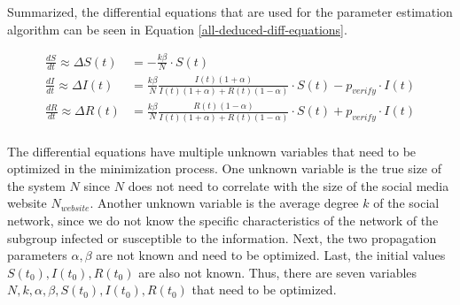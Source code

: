 Summarized, the differential equations that are used for the parameter estimation 
algorithm can be seen in Equation \ref{all-deduced-diff-equations}.

\begin{subequations}
    \begin{align}
        \frac{dS}{dt} \approx \Delta S(t) &= -\frac{k\beta}{N} \cdot S(t) \\
        \frac{dI}{dt} \approx  \Delta I(t) &=  \frac{k\beta}{N} \frac{I(t)(1+\alpha)}{I(t)(1+\alpha)+R(t)(1-\alpha)}
        \cdot S(t) - p_{verify}\cdot I(t) \\
        \frac{dR}{dt} \approx \Delta R(t) &= \frac{k\beta}{N} \frac{R(t)(1-\alpha)}{I(t)(1+\alpha)+R(t)(1-\alpha)} 
        \cdot S(t) + p_{verify}\cdot I(t)\\
\end{align}
\label{all-deduced-diff-equations}
\end{subequations}


The differential equations have multiple unknown variables that need
to be optimized in the minimization process. One unknown variable is
the true size of the system $N$ since $N$ does not need to correlate 
with the size of the social media website $N_{website}$.
Another unknown variable is the average degree $k$ of the social network,
since we do not know the specific characteristics of the network of the
subgroup infected or susceptible to the information.
Next, the two propagation parameters $\alpha, \beta$ are not known
and need to be optimized. 
Last, the initial values $S(t_0), I(t_0), R(t_0)$ are also not known.
Thus, there are seven variables $N, k, \alpha, \beta, S(t_0), I(t_0), R(t_0)$
that need to be optimized.


